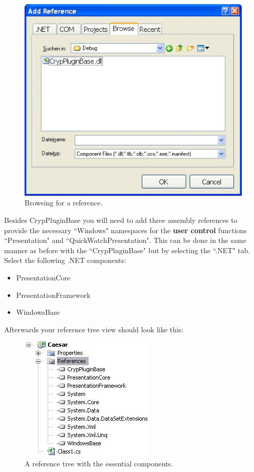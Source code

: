 \begin{figure}[h!]
	\centering
		\includegraphics{figures/browse_reference.jpg}
	\caption{Browsing for a reference.}
	\label{fig:browse_reference}
\end{figure}

\noindent Besides CrypPluginBase you will need to add three assembly references to provide the necessary ``Windows" namespaces for the \textbf{user control} functions ``Presentation" and ``QuickWatchPresentation". This can be done in the same manner as before with the ``CrypPluginBase" but by selecting the ``.NET" tab. Select the following .NET components:

\begin{itemize}
    \item PresentationCore
    \item PresentationFramework
    \item WindowsBase
\end{itemize}
\clearpage

\noindent Afterwards your reference tree view should look like this:

\begin{figure}[h!]
		\includegraphics{figures/reference_tree.jpg}
	\caption{A reference tree with the essential components.}
	\label{fig:reference_tree}
\end{figure}

